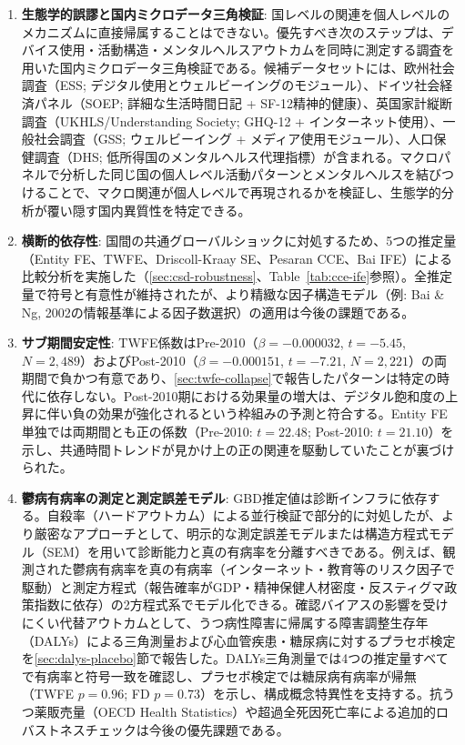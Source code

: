 \documentclass[a4paper,11pt,titlepage]{article}
\begin{document}
\begin{enumerate}
  \item \textbf{生態学的誤謬と国内ミクロデータ三角検証}: 国レベルの関連を個人レベルのメカニズムに直接帰属することはできない。優先すべき次のステップは、デバイス使用・活動構造・メンタルヘルスアウトカムを同時に測定する調査を用いた国内ミクロデータ三角検証である。候補データセットには、欧州社会調査（ESS; デジタル使用とウェルビーイングのモジュール）、ドイツ社会経済パネル（SOEP; 詳細な生活時間日記 + SF-12精神的健康）、英国家計縦断調査（UKHLS/Understanding Society; GHQ-12 + インターネット使用）、一般社会調査（GSS; ウェルビーイング + メディア使用モジュール）、人口保健調査（DHS; 低所得国のメンタルヘルス代理指標）が含まれる。マクロパネルで分析した同じ国の個人レベル活動パターンとメンタルヘルスを結びつけることで、マクロ関連が個人レベルで再現されるかを検証し、生態学的分析が覆い隠す国内異質性を特定できる。
  \item \textbf{横断的依存性}: 国間の共通グローバルショックに対処するため、5つの推定量（Entity FE、TWFE、Driscoll-Kraay SE、Pesaran CCE、Bai IFE）による比較分析を実施した（\cref{sec:csd-robustness}、Table~\ref{tab:cce-ife}参照）。全推定量で符号と有意性が維持されたが、より精緻な因子構造モデル（例: Bai \& Ng, 2002の情報基準による因子数選択）の適用は今後の課題である。
  \item \textbf{サブ期間安定性}: TWFE係数はPre-2010（$\beta = -0.000032$, $t = -5.45$, $N = 2{,}489$）およびPost-2010（$\beta = -0.000151$, $t = -7.21$, $N = 2{,}221$）の両期間で負かつ有意であり、\cref{sec:twfe-collapse}で報告したパターンは特定の時代に依存しない。Post-2010期における効果量の増大は、デジタル飽和度の上昇に伴い負の効果が強化されるという枠組みの予測と符合する。Entity FE単独では両期間とも正の係数（Pre-2010: $t = 22.48$; Post-2010: $t = 21.10$）を示し、共通時間トレンドが見かけ上の正の関連を駆動していたことが裏づけられた。
  \item \textbf{鬱病有病率の測定と測定誤差モデル}: GBD推定値は診断インフラに依存する。自殺率（ハードアウトカム）による並行検証で部分的に対処したが、より厳密なアプローチとして、明示的な測定誤差モデルまたは構造方程式モデル（SEM）を用いて診断能力と真の有病率を分離すべきである。例えば、観測された鬱病有病率を真の有病率（インターネット・教育等のリスク因子で駆動）と測定方程式（報告確率がGDP・精神保健人材密度・反スティグマ政策指数に依存）の2方程式系でモデル化できる。確認バイアスの影響を受けにくい代替アウトカムとして、うつ病性障害に帰属する障害調整生存年（DALYs）による三角測量および心血管疾患・糖尿病に対するプラセボ検定を\ref{sec:dalys-placebo}節で報告した。DALYs三角測量では4つの推定量すべてで有病率と符号一致を確認し、プラセボ検定では糖尿病有病率が帰無（TWFE $p = 0.96$; FD $p = 0.73$）を示し、構成概念特異性を支持する。抗うつ薬販売量（OECD Health Statistics）や超過全死因死亡率による追加的ロバストネスチェックは今後の優先課題である。

\end{enumerate}
\end{document}
